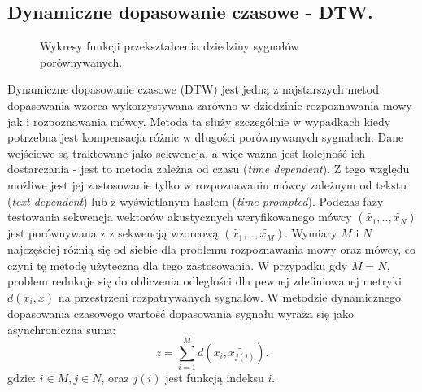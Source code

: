 \subsection{Dynamiczne dopasowanie czasowe - DTW.}

\begin{figure}
  \centering
    
    \caption{Wykresy funkcji przekształcenia dziedziny sygnałów porównywanych. }
    \label{dtw}
\end{figure}

Dynamiczne dopasowanie czasowe (DTW) jest jedną z najstarszych metod dopasowania wzorca \cite{multidsp} wykorzystywana zarówno w dziedzinie rozpoznawania mowy jak i rozpoznawania mówcy. Metoda ta służy szczególnie w wypadkach kiedy potrzebna jest kompensacja różnic w długości porównywanych sygnałach. Dane wejściowe są traktowane jako sekwencja, a więc ważna jest kolejność ich dostarczania - jest to metoda zależna od czasu (\textit{time dependent}). Z tego względu możliwe jest jej zastosowanie tylko w rozpoznawaniu mówcy zależnym od tekstu (\textit{text-dependent}) lub z wyświetlanym hasłem (\textit{time-prompted}). Podczas fazy testowania sekwencja wektorów akustycznych weryfikowanego mówcy $(\tilde{x_1},..,\tilde{x_N})$ jest porównywana z z sekwencją wzorcową $(\tilde{x_1},..,\tilde{x_M})$. Wymiary $M$ i $N$ najczęściej różnią się od siebie dla problemu rozpoznawania mowy oraz mówcy, co czyni tę metodę użyteczną dla tego zastosowania. W przypadku gdy $M=N$, problem redukuje się do obliczenia odległości dla pewnej zdefiniowanej metryki $d(x_i, \tilde{x})$ na przestrzeni rozpatrywanych sygnałów. W metodzie dynamicznego dopasowania czasowego wartość dopasowania sygnału wyraża się jako asynchroniczna suma:
\begin{equation}
  z = \sum_{i=1}^{M} d(x_i,\tilde{x_{j(i)}}).
  \label{z}
\end{equation}
gdzie: $i \in M, j \in N$, oraz $j(i)$ jest funkcją indeksu $i$.
